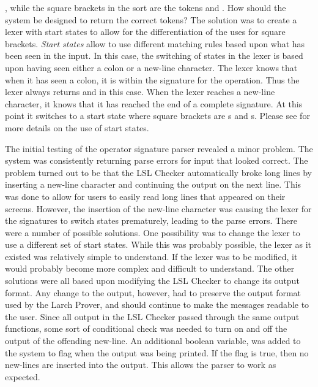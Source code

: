 , while the square brackets in the sort
 are the tokens  and . How should
the system be designed to return the correct tokens? The solution was
to create a lexer with start states to allow for the differentiation
of the uses for square brackets. \emph{Start states} allow  to use
different matching rules based upon what has been seen in the
input. In this case, the switching of states in the lexer is based
upon having seen either a colon or a new-line character. The lexer
knows that when it has seen a colon, it is within the signature for
the operation. Thus the lexer always returns  and
 in 
this case. When the lexer reaches a new-line character, it knows that
it has reached the end of a complete signature. At this point it
switches to a start state where square brackets are s and
s. Please see
\cite{Levine-Mason-Brown92} for more details on the use of start states.

The initial testing of the operator signature parser revealed a minor
problem. The system was consistently returning parse errors for input
that looked correct. The problem turned out to be that the LSL Checker
automatically broke long lines by inserting a
new-line character and continuing the output on the next line. This
was done to allow for users to easily read long lines that appeared on
their screens. However, the insertion of the new-line character was
causing the lexer for the signatures to switch states prematurely,
leading to the parse errors. There were a number of possible
solutions. One possibility was to change the lexer to use a different
set of start states. While this was probably possible, the lexer as
it existed was relatively simple to understand. If the lexer was to be
modified, it would probably become more complex and difficult to
understand. The other solutions were all based upon modifying the LSL
Checker to change its output format. Any change to the output,
however, had to preserve the output format used by the Larch Prover,
and should continue to make the messages readable to the user. Since
all output in the LSL Checker passed through the same output
functions, some sort of conditional check was needed to turn on and
off the output of the offending new-line. An additional boolean
variable,  was added to the system to flag when
the  output was being printed. If the flag is true,
then no new-lines are inserted into the output. This allows the parser
to work as expected.

